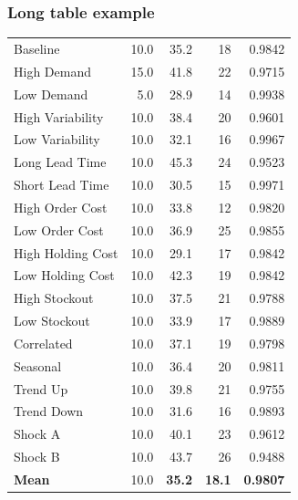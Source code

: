 \expandafter\documentclass\expandafter[\presentationclassoptions]{beamer}
\begin{document}
\begin{frame}[allowframebreaks]
  \frametitle{Long table example}
  \footnotesize
  \tabletail{\midrule}
  \tablelasttail{\bottomrule}
  \begin{xtabular*}{\textwidth}{@{\extracolsep\fill}lrrrr}
    \shrinkheight{0pt}
    Baseline          & 10.0 & 35.2 & 18 & 0.9842 \\
    High Demand       & 15.0 & 41.8 & 22 & 0.9715 \\
    Low Demand        &  5.0 & 28.9 & 14 & 0.9938 \\
    High Variability  & 10.0 & 38.4 & 20 & 0.9601 \\
    Low Variability   & 10.0 & 32.1 & 16 & 0.9967 \\
    Long Lead Time    & 10.0 & 45.3 & 24 & 0.9523 \\
    Short Lead Time   & 10.0 & 30.5 & 15 & 0.9971 \\
    High Order Cost   & 10.0 & 33.8 & 12 & 0.9820 \\
    Low Order Cost    & 10.0 & 36.9 & 25 & 0.9855 \\
    High Holding Cost & 10.0 & 29.1 & 17 & 0.9842 \\
    Low Holding Cost  & 10.0 & 42.3 & 19 & 0.9842 \\
    High Stockout     & 10.0 & 37.5 & 21 & 0.9788 \\
    Low Stockout      & 10.0 & 33.9 & 17 & 0.9889 \\
    Correlated        & 10.0 & 37.1 & 19 & 0.9798 \\
    Seasonal          & 10.0 & 36.4 & 20 & 0.9811 \\
    Trend Up          & 10.0 & 39.8 & 21 & 0.9755 \\
    Trend Down        & 10.0 & 31.6 & 16 & 0.9893 \\
    Shock A           & 10.0 & 40.1 & 23 & 0.9612 \\
    Shock B           & 10.0 & 43.7 & 26 & 0.9488 \\
    \textbf{Mean}     & 10.0 & \textbf{35.2} & \textbf{18.1} & \textbf{0.9807} \\
  \end{xtabular*}
\end{frame}
\end{document}
